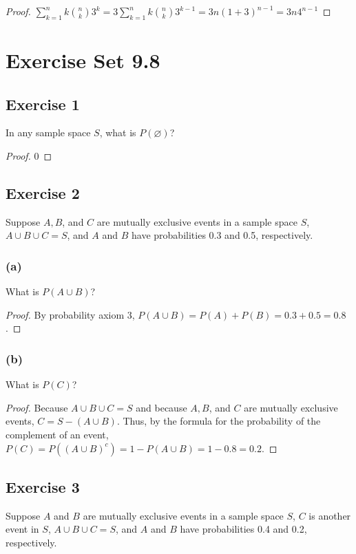 \documentclass[14pt]{extarticle}
\newcommand{\dps}{\displaystyle}
\newcommand{\es}{\varnothing}
\begin{document}
\begin{proof}
\(\dps \sum_{k=1}^{n} k \binom{n}{k} 3^k = 3 \sum_{k=1}^{n} k \binom{n}{k} 3^{k-1} = 3n(1+3)^{n-1} = 3n4^{n-1}\)
\end{proof}

\section{Exercise Set 9.8}
\subsection{Exercise 1}
In any sample space \(S\), what is \(P(\es)\)?
\begin{proof}
0
\end{proof}

\subsection{Exercise 2}
Suppose \(A, B\), and \(C\) are mutually exclusive events in a sample space \(S\), \(A \cup B \cup C = S\), and \(A\) and 
\(B\) have probabilities 0.3 and 0.5, respectively.

\subsubsection{(a)}
What is \(P(A \cup B)\)? 
\begin{proof}
By probability axiom 3, \(P(A \cup B) = P(A) + P(B) = 0.3 + 0.5 = 0.8\).
\end{proof}

\subsubsection{(b)}
What is \(P(C)\)?
\begin{proof}
Because \(A \cup B \cup C = S\) and because \(A, B\), and \(C\) are mutually exclusive events, \(C = S - (A \cup B)\). 
Thus, by the formula for the probability of the complement of an event, \(P(C) = P((A \cup B)^c) = 1 - P(A \cup B) = 1 - 0.8 
= 0.2\).
\end{proof}

\subsection{Exercise 3}
Suppose \(A\) and \(B\) are mutually exclusive events in a sample space \(S\), \(C\) is another event in \(S\), 
\(A \cup B \cup C = S\), and \(A\) and \(B\) have probabilities 0.4 and 0.2, respectively.
\end{document}
